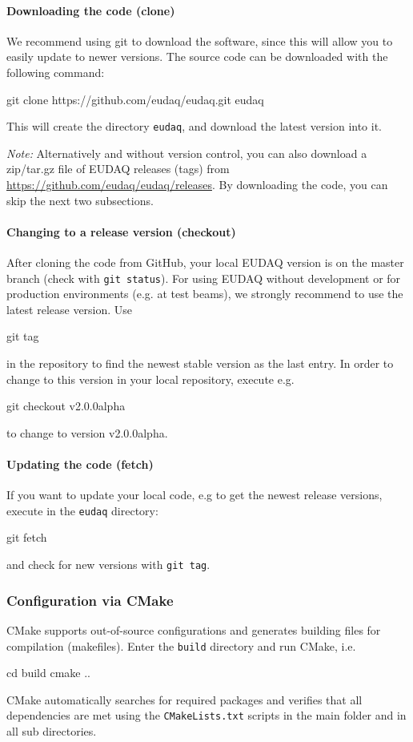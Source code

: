 \paragraph{Downloading the code (clone)}
We recommend using git to download the software,
since this will allow you to easily update to newer versions.
The source code can be downloaded with the following command:
\begin{listing}[mybash]
git clone https://github.com/eudaq/eudaq.git eudaq
\end{listing}
This will create the directory \texttt{eudaq}, and download the latest
version into it. 

\textit{Note:} Alternatively and without version control, you can also download a zip/tar.gz file of EUDAQ releases (tags) from \url{https://github.com/eudaq/eudaq/releases}. 
By downloading the code, you can skip the next two subsections. 

\paragraph{Changing to a release version (checkout)}
After cloning the code from GitHub, your local EUDAQ version is on the master branch (check with \texttt{git status}).  
For using EUDAQ without development or for production environments (e.g. at test beams), we strongly recommend to use the latest release version. 
Use 
\begin{listing}[mybash]
git tag 
\end{listing}
in the repository to find the newest stable version as the last entry.
In order to change to this version in your local repository, execute e.g. 
\begin{listing}[mybash]
git checkout v2.0.0alpha
\end{listing}
to change to version v2.0.0alpha.

\paragraph{Updating the code (fetch)}
If you want to update your local code, e.g to get the newest release versions, execute in the \texttt{eudaq} directory: 
\begin{listing}[mybash]
git fetch
\end{listing}
and check for new versions with \texttt{git tag}. 


\subsubsection{Configuration via CMake}
\label{sec:cmake}
CMake supports out-of-source configurations and generates building files for compilation (makefiles). 
Enter the \texttt{build} directory and run CMake, i.e.
\begin{listing}[mybash]
cd build
cmake ..
\end{listing}
CMake automatically searches for required packages and verifies that all dependencies are met using the \texttt{CMakeLists.txt} scripts in the main folder and in all sub directories. 

